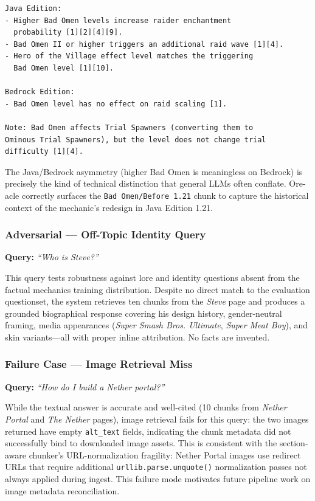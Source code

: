 \documentclass[11pt,a4paper]{article}
\begin{document}
\begin{lstlisting}
Java Edition:
- Higher Bad Omen levels increase raider enchantment
  probability [1][2][4][9].
- Bad Omen II or higher triggers an additional raid wave [1][4].
- Hero of the Village effect level matches the triggering
  Bad Omen level [1][10].

Bedrock Edition:
- Bad Omen level has no effect on raid scaling [1].

Note: Bad Omen affects Trial Spawners (converting them to
Ominous Trial Spawners), but the level does not change trial
difficulty [1][4].
\end{lstlisting}

\noindent The Java/Bedrock asymmetry (higher Bad Omen is meaningless on Bedrock) is precisely the kind of technical distinction that general LLMs often conflate. Ore-acle correctly surfaces the \texttt{Bad Omen/Before 1.21} chunk to capture the historical context of the mechanic's redesign in Java Edition 1.21.

\subsubsection*{Adversarial --- Off-Topic Identity Query}

\textbf{Query:} \textit{``Who is Steve?''}

This query tests robustness against lore and identity questions absent from the factual mechanics training distribution. Despite no direct match to the evaluation questionset, the system retrieves ten chunks from the \textit{Steve} page and produces a grounded biographical response covering his design history, gender-neutral framing, media appearances (\textit{Super Smash Bros. Ultimate}, \textit{Super Meat Boy}), and skin variants---all with proper inline attribution. No facts are invented.

\subsubsection*{Failure Case --- Image Retrieval Miss}

\textbf{Query:} \textit{``How do I build a Nether portal?''}

While the textual answer is accurate and well-cited (10 chunks from \textit{Nether Portal} and \textit{The Nether} pages), image retrieval fails for this query: the two images returned have empty \texttt{alt\_text} fields, indicating the chunk metadata did not successfully bind to downloaded image assets. This is consistent with the section-aware chunker's URL-normalization fragility: Nether Portal images use redirect URLs that require additional \texttt{urllib.parse.unquote()} normalization passes not always applied during ingest. This failure mode motivates future pipeline work on image metadata reconciliation.
\end{document}
